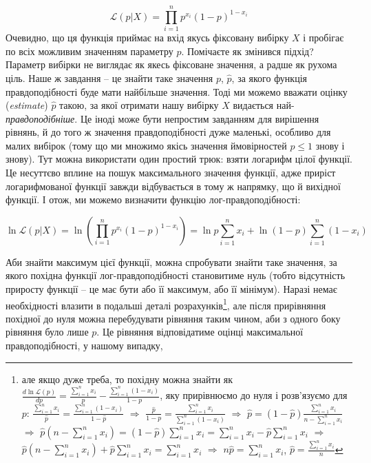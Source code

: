 \documentclass[
  11pt,
]{book}
\begin{document}
\[\mathcal{L}(p|X) = \prod \limits_{i = 1}^n p^{x_i} (1 - p)^{1-x_i}\]
Очевидно, що ця функція приймає на вхід якусь фіксовану вибірку \(X\) і пробігає по всіх можливим значенням параметру \(p\). Помічаєте як змінився підхід? Параметр вибірки не виглядає як якесь фіксоване значення, а радше як рухома ціль. Наше ж завдання -- це знайти таке значення \(p\), \(\hat{p}\), за якого функція правдоподібності буде мати найбільше значення. Тоді ми можемо вважати оцінку (\emph{estimate}) \(\hat{p}\) такою, за якої отримати нашу вибірку \(X\) видається най-\emph{правдоподібніше}. Це іноді може бути непростим завданням для вирішення рівнянь, й до того ж значення правдоподібності дуже маленькі, особливо для малих вибірок (тому що ми множимо якісь значення ймовірностей \(p \leq 1\) знову і знову). Тут можна використати один простий трюк: взяти логарифм цілої функції. Це несуттєво вплине на пошук максимального значення функції, адже приріст логарифмованої функції завжди відбувається в тому ж напрямку, що й вихідної функції. І отож, ми можемо визначити функцію лог-правдоподібності:

\[\ln \mathcal{L}(p|X) = \ln \left( \prod \limits_{i = 1}^n p^{x_i} (1 - p)^{1-x_i} \right) = \ln p \sum \limits_{i=1}^n x_i + \ln (1-p) \sum \limits_{i=1}^n (1 - x_i)\]

Аби знайти максимум цієї функції, можна спробувати знайти таке значення, за якого похідна функції лог-правдоподібності становитиме нуль (тобто відсутність приросту функції -- це має бути або її максимум, або її мінімум). Наразі немає необхідності влазити в подальші деталі розрахунків\footnote{але якщо дуже треба, то похідну можна знайти як \(\frac{d \ln \mathcal{L} (p)}{d p} = \frac{\sum_{i=1}^n x_i}{p} - \frac{\sum_{i=1}^n (1 - x_i)}{1-p}\), яку прирівнюємо до нуля і розв'язуємо для \(p\): \(\frac{\sum_{i=1}^n x_i}{\hat{p}} = \frac{\sum_{i=1}^n (1 - x_i)}{1-\hat{p}}\) \(\Rightarrow\) \(\frac{\hat{p}}{1 - p} = \frac{\sum_{i=1}^n x_i}{\sum_{i=1}^n (1 - x_i)}\) \(\Rightarrow\) \(\hat{p} = (1 - \hat{p}) \frac{\sum_{i=1}^n x_i}{n - \sum_{i=1}^n x_i}\) \(\Rightarrow\) \(\hat{p} (n - \sum_{i=1}^n x_i) = (1 - \hat{p}) \sum_{i=1}^n x_i = \sum_{i=1}^n x_i - \hat{p} \sum_{i=1}^n x_i\) \(\Rightarrow\) \(\hat{p} (n - \sum_{i=1}^n x_i) + \hat{p} \sum_{i=1}^n x_i = \sum_{i=1}^n x_i\) \(\Rightarrow\) \(n\hat{p} = \sum_{i=1}^n x_i\), \(\hat{p} = \frac{\sum_{i=1}^n x_i}{n}\)}, але після прирівняння похідної до нуля можна перебудувати рівняння таким чином, аби з одного боку рівняння було лише \(p\). Це рівняння відповідатиме оцінці максимальної правдоподібності, у нашому випадку,
\end{document}
